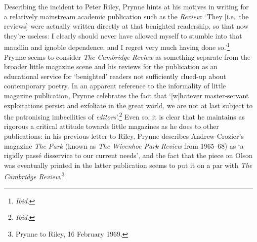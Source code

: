 \documentclass[]{article}
\begin{document}
Describing the incident to Peter Riley, Prynne hints at his motives in
writing for a relatively mainstream academic publication such as the
\emph{Review}: `They {[}i.e.~the reviews{]} were actually written
directly at that benighted readership, so that now they're useless: I
clearly should never have allowed myself to stumble into that maudlin
and ignoble dependence, and I regret very much having done
so.'\footnote{\emph{Ibid}.} Prynne seems to consider \emph{The Cambridge
Review} as something separate from the broader little magazine scene and
his reviews for the publication as an educational service for
`benighted' readers not sufficiently clued-up about contemporary poetry.
In an apparent reference to the informality of little magazine
publication, Prynne celebrates the fact that `{[}w{]}hatever
master-servant exploitations persist and exfoliate in the great world,
we are not at last subject to the patronising imbecilities of
\emph{editors}'.\footnote{\emph{Ibid}.} Even so, it is clear that he
maintains as rigorous a critical attitude towards little magazines as he
does to other publications: in his previous letter to Riley, Prynne
describes Andrew Crozier's magazine \emph{The Park} (known as \emph{The
Wivenhoe Park Review} from 1965--68) as `a rigidly passé disservice to
our current needs', and the fact that the piece on Olson was eventually
printed in the latter publication seems to put it on a par with
\emph{The Cambridge Review}.\footnote{Prynne to Riley, 16 February 1969.}
\end{document}
